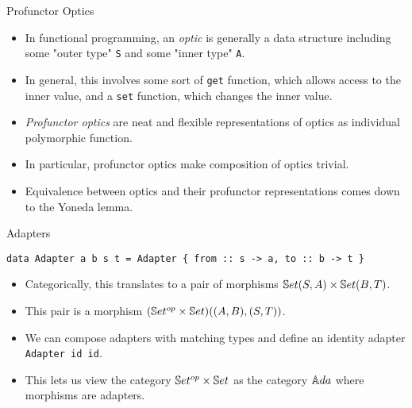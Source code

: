 \begin{frame}[fragile]{Profunctor Optics}
	\begin{itemize}
		\item In functional programming, an \textit{optic} is generally a data structure including some "outer type" \texttt{S} and some "inner type" \texttt{A}.
		\pause\item In general, this involves some sort of \texttt{get} function, which allows access to the inner value, and a \texttt{set} function, which changes the inner value.
		\pause\item \textit{Profunctor optics} are neat and flexible representations of optics as individual polymorphic function.
		\pause\item In particular, profunctor optics make composition of optics trivial.
		\pause\item Equivalence between optics and their profunctor representations comes down to the Yoneda lemma.
	\end{itemize}
\end{frame}
\begin{frame}[fragile]{Adapters}
	\begin{lstlisting}
data Adapter a b s t = Adapter { from :: s -> a, to :: b -> t }
	\end{lstlisting}
	\begin{itemize}
		\pause\item Categorically, this translates to a pair of morphisms $\mathbb{S}et(S,A) \times \mathbb{S}et(B,T)$. 
		\pause\item This pair is a morphism $(\mathbb{S}et^{op} \times \mathbb{S}et)((A,B), (S,T))$.
		\pause\item We can compose adapters with matching types and define an identity adapter \texttt{Adapter id id}.
		\pause\item This lets us view the category $\mathbb{S}et^{op} \times \mathbb{S}et$ as the category ${\mathbb{A}da}$ where morphisms are adapters.
	\end{itemize}
\end{frame}
